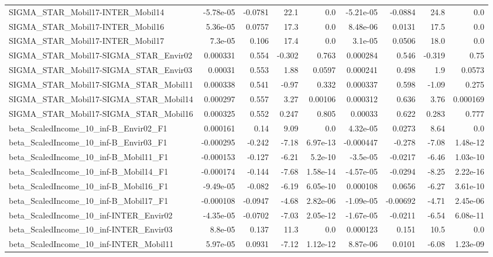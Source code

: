 \begin{tabular}{lrrrrrrrr}
SIGMA_STAR_Mobil17-INTER_Mobil14 & -5.78e-05 & -0.0781 & 22.1 & 0.0 & -5.21e-05 & -0.0884 & 24.8 & 0.0 \\
SIGMA_STAR_Mobil17-INTER_Mobil16 & 5.36e-05 & 0.0757 & 17.3 & 0.0 & 8.48e-06 & 0.0131 & 17.5 & 0.0 \\
SIGMA_STAR_Mobil17-INTER_Mobil17 & 7.3e-05 & 0.106 & 17.4 & 0.0 & 3.1e-05 & 0.0506 & 18.0 & 0.0 \\
SIGMA_STAR_Mobil17-SIGMA_STAR_Envir02 & 0.000331 & 0.554 & -0.302 & 0.763 & 0.000284 & 0.546 & -0.319 & 0.75 \\
SIGMA_STAR_Mobil17-SIGMA_STAR_Envir03 & 0.00031 & 0.553 & 1.88 & 0.0597 & 0.000241 & 0.498 & 1.9 & 0.0573 \\
SIGMA_STAR_Mobil17-SIGMA_STAR_Mobil11 & 0.000338 & 0.541 & -0.97 & 0.332 & 0.000337 & 0.598 & -1.09 & 0.275 \\
SIGMA_STAR_Mobil17-SIGMA_STAR_Mobil14 & 0.000297 & 0.557 & 3.27 & 0.00106 & 0.000312 & 0.636 & 3.76 & 0.000169 \\
SIGMA_STAR_Mobil17-SIGMA_STAR_Mobil16 & 0.000325 & 0.552 & 0.247 & 0.805 & 0.00033 & 0.622 & 0.283 & 0.777 \\
beta_ScaledIncome_10_inf-B_Envir02_F1 & 0.000161 & 0.14 & 9.09 & 0.0 & 4.32e-05 & 0.0273 & 8.64 & 0.0 \\
beta_ScaledIncome_10_inf-B_Envir03_F1 & -0.000295 & -0.242 & -7.18 & 6.97e-13 & -0.000447 & -0.278 & -7.08 & 1.48e-12 \\
beta_ScaledIncome_10_inf-B_Mobil11_F1 & -0.000153 & -0.127 & -6.21 & 5.2e-10 & -3.5e-05 & -0.0217 & -6.46 & 1.03e-10 \\
beta_ScaledIncome_10_inf-B_Mobil14_F1 & -0.000174 & -0.144 & -7.68 & 1.58e-14 & -4.57e-05 & -0.0294 & -8.25 & 2.22e-16 \\
beta_ScaledIncome_10_inf-B_Mobil16_F1 & -9.49e-05 & -0.082 & -6.19 & 6.05e-10 & 0.000108 & 0.0656 & -6.27 & 3.61e-10 \\
beta_ScaledIncome_10_inf-B_Mobil17_F1 & -0.000108 & -0.0947 & -4.68 & 2.82e-06 & -1.09e-05 & -0.00692 & -4.71 & 2.45e-06 \\
beta_ScaledIncome_10_inf-INTER_Envir02 & -4.35e-05 & -0.0702 & -7.03 & 2.05e-12 & -1.67e-05 & -0.0211 & -6.54 & 6.08e-11 \\
beta_ScaledIncome_10_inf-INTER_Envir03 & 8.8e-05 & 0.137 & 11.3 & 0.0 & 0.000123 & 0.151 & 10.5 & 0.0 \\
beta_ScaledIncome_10_inf-INTER_Mobil11 & 5.97e-05 & 0.0931 & -7.12 & 1.12e-12 & 8.87e-06 & 0.0101 & -6.08 & 1.23e-09 \\

\end{tabular}
